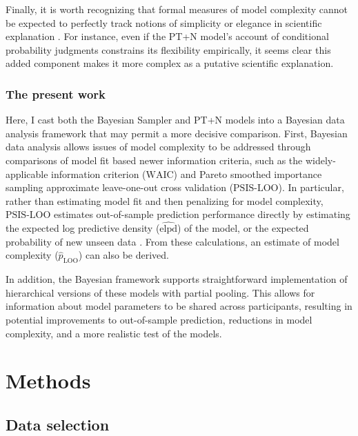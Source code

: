 \documentclass[
  english,
  man,floatsintext]{apa6}
\begin{document}
Finally, it is worth recognizing that formal measures of model complexity cannot be expected to perfectly track notions of simplicity or elegance in scientific explanation \autocites[for some related discussions, see][]{kuhn1977,sober2002,piantadosi2018}. For instance, even if the PT+N model's account of conditional probability judgments constrains its flexibility empirically, it seems clear this added component makes it more complex as a putative scientific explanation.

\hypertarget{the-present-work}{%
\subsubsection{The present work}\label{the-present-work}}

Here, I cast both the Bayesian Sampler and PT+N models into a Bayesian data analysis framework that may permit a more decisive comparison. First, Bayesian data analysis allows issues of model complexity to be addressed through comparisons of model fit based newer information criteria, such as the widely-applicable information criterion (\({\text{WAIC}}\)) and Pareto smoothed importance sampling approximate leave-one-out cross validation (\(\text{PSIS-LOO}\)). In particular, rather than estimating model fit and then penalizing for model complexity, \(\text{PSIS-LOO}\) estimates out-of-sample prediction performance directly by estimating the expected log predictive density (\(\widehat{\text{elpd}}\)) of the model, or the expected probability of new unseen data \autocite{gelman.etal2014,vehtari.etal2017}. From these calculations, an estimate of model complexity (\(\hat{p}_{\text{LOO}}\)) can also be derived.

In addition, the Bayesian framework supports straightforward implementation of hierarchical versions of these models with partial pooling. This allows for information about model parameters to be shared across participants, resulting in potential improvements to out-of-sample prediction, reductions in model complexity, and a more realistic test of the models.

\hypertarget{methods}{%
\section{Methods}\label{methods}}

\hypertarget{data-selection}{%
\subsection{Data selection}\label{data-selection}}
\end{document}
